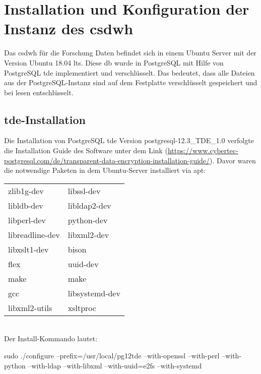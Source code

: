 \chapter{Installation und Konfiguration der Instanz des \acs{csdwh}}
    
    Das \ac{csdwh} für die Forschung Daten befindet sich in einem Ubuntu Server mit der Version Ubuntu 18.04 \ac{lts}. Diese \ac{db} wurde in PostgreSQL mit Hilfe von PostgreSQL \ac{tde} implementiert und verschlüsselt. Das bedeutet, dass alle Dateien aus der PostgreSQL-Instanz sind auf dem Festplatte verschlüsselt gespeichert und bei lesen entschlüsselt.
    
    \section{\acs{tde}-Installation}    
    
    Die Installation von PostgreSQL \ac{tde} Version postgresql-12.3\_TDE\_1.0 verfolgte die Installation Guide des Software unter dem Link  (\url{https://www.cybertec-postgresql.com/de/transparent-data-encryption-installation-guide/}). Davor waren die notwendige Paketen in dem Ubuntu-Server installiert via \textsf{apt}:
    
    \begin{tabular}{ll}
    	\textsf{zlib1g-dev} & \textsf{libssl-dev} \\ 
    	\textsf{libldb-dev} & \textsf{libldap2-dev} \\
    	\textsf{libperl-dev} & \textsf{python-dev} \\
    	\textsf{libreadline-dev} & \textsf{libxml2-dev} \\
    	\textsf{libxslt1-dev} & \textsf{bison} \\
    	\textsf{flex} & \textsf{uuid-dev} \\
    	\textsf{make} & \textsf{make} \\
    	\textsf{gcc} & \textsf{libsystemd-dev} \\
    	\textsf{libxml2-utils} & \textsf{xsltproc} \\
    \end{tabular} \\
    
    Der Install-Kommando lautet: 
           
    sudo ./configure --prefix=/usr/local/pg12tde --with-openssl --with-perl --with-python --with-ldap --with-libxml --with-uuid=e2fs --with-systemd\\ \\
    
